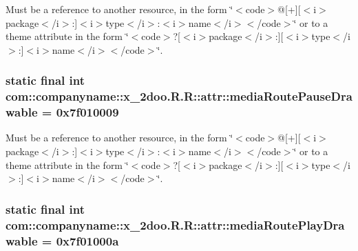 Must be a reference to another resource, in the form \char`\"{}$<$code$>$@\mbox{[}+\mbox{]}\mbox{[}$<$i$>$package$<$/i$>$:\mbox{]}$<$i$>$type$<$/i$>$:$<$i$>$name$<$/i$>$$<$/code$>$\char`\"{} or to a theme attribute in the form \char`\"{}$<$code$>$?\mbox{[}$<$i$>$package$<$/i$>$:\mbox{]}\mbox{[}$<$i$>$type$<$/i$>$:\mbox{]}$<$i$>$name$<$/i$>$$<$/code$>$\char`\"{}. \hypertarget{classcom_1_1companyname_1_1x__2doo_1_1_r_1_1attr_f9b28a171e46dac9fac29bad4777664f}{
\subsubsection[{mediaRoutePauseDrawable}]{\setlength{\rightskip}{0pt plus 5cm}static final int com::companyname::x\_\-2doo.R.R::attr::mediaRoutePauseDrawable = 0x7f010009}}
\label{classcom_1_1companyname_1_1x__2doo_1_1_r_1_1attr_f9b28a171e46dac9fac29bad4777664f}


Must be a reference to another resource, in the form \char`\"{}$<$code$>$@\mbox{[}+\mbox{]}\mbox{[}$<$i$>$package$<$/i$>$:\mbox{]}$<$i$>$type$<$/i$>$:$<$i$>$name$<$/i$>$$<$/code$>$\char`\"{} or to a theme attribute in the form \char`\"{}$<$code$>$?\mbox{[}$<$i$>$package$<$/i$>$:\mbox{]}\mbox{[}$<$i$>$type$<$/i$>$:\mbox{]}$<$i$>$name$<$/i$>$$<$/code$>$\char`\"{}. \hypertarget{classcom_1_1companyname_1_1x__2doo_1_1_r_1_1attr_473ffcf59b7603860281f3582d57f510}{
\subsubsection[{mediaRoutePlayDrawable}]{\setlength{\rightskip}{0pt plus 5cm}static final int com::companyname::x\_\-2doo.R.R::attr::mediaRoutePlayDrawable = 0x7f01000a}}
\label{classcom_1_1companyname_1_1x__2doo_1_1_r_1_1attr_473ffcf59b7603860281f3582d57f510}


